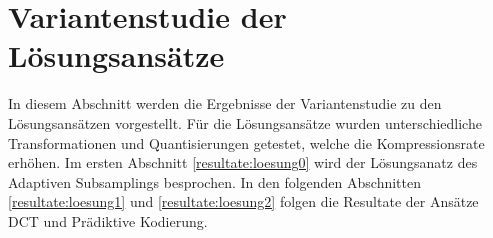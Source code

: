 \section{Variantenstudie der Lösungsansätze}\label{resultate}
In diesem Abschnitt werden die Ergebnisse der Variantenstudie zu den Lösungsansätzen vorgestellt. Für die Lösungsansätze wurden unterschiedliche Transformationen und Quantisierungen getestet, welche die Kompressionsrate erhöhen. Im ersten Abschnitt \ref{resultate:loesung0} wird der Lösungsanatz des Adaptiven Subsamplings besprochen. In den folgenden Abschnitten \ref{resultate:loesung1} und \ref{resultate:loesung2} folgen die Resultate der Ansätze DCT und Prädiktive Kodierung.


\pagebreak

\pagebreak
